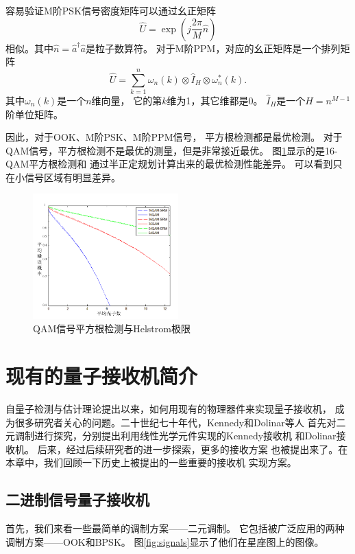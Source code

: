 容易验证M阶PSK信号密度矩阵可以通过幺正矩阵\cite{kato1999quantum}
\begin{equation}
\hat{U} = \exp(j\frac{2\pi}{M} \hat{n})
\end{equation}
相似。其中$\hat{n}=\hat{a}^\dagger \hat{a}$是粒子数算符。
对于M阶PPM，对应的幺正矩阵是一个排列矩阵\cite{cariolaro2010theory}
\begin{equation}
\hat{U} = \sum_{k=1}^n \omega_n(k) \otimes \hat{I}_H \otimes \omega_n^*(k).
\end{equation}
其中$\omega_n(k)$是一个$n$维向量，
它的第$k$维为1，其它维都是0。
$\hat{I}_H$是一个$H=n^{M-1}$阶单位矩阵。

因此，对于OOK、M阶PSK、M阶PPM信号，
平方根检测都是最优检测。
对于QAM信号，平方根检测不是最优的测量，但是非常接近最优。
图\ref{fig:SRM-vs-Hel}显示的是16-QAM平方根检测和
通过半正定规划计算出来的最优检测性能差异。
可以看到只在小信号区域有明显差异。

\begin{figure}
\centering
  \includegraphics[width=0.5\textwidth]{figures/chap2/QAM-SRM-vs-Helstrom}
  \caption{QAM信号平方根检测与Helstrom极限}
  \label{fig:SRM-vs-Hel}
\end{figure}


\section{现有的量子接收机简介}
自量子检测与估计理论提出以来，如何用现有的物理器件来实现量子接收机，
成为很多研究者关心的问题。二十世纪七十年代，Kennedy和Dolinar等人
首先对二元调制进行探究，分别提出利用线性光学元件实现的Kennedy接收机
和Dolinar接收机\cite{kennedy1973near,dolinar1973optimum}。
后来，经过后续研究者的进一步探索，更多的接收方案
也被提出来了。在本章中，我们回顾一下历史上被提出的一些重要的接收机
实现方案。
\subsection{二进制信号量子接收机}
首先，我们来看一些最简单的调制方案——二元调制。
它包括被广泛应用的两种调制方案——OOK和BPSK。
图\ref{fig:signals}显示了他们在星座图上的图像。



